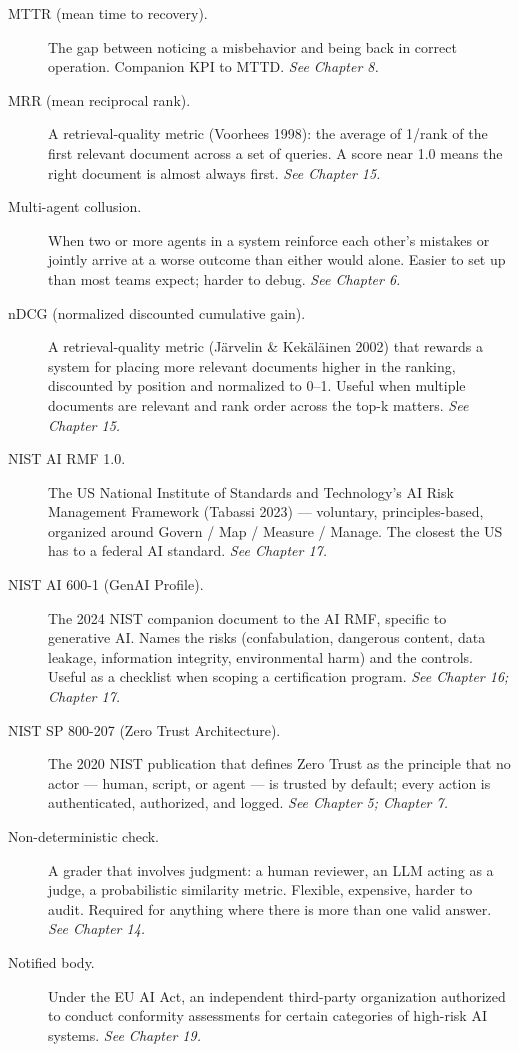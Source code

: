 \begin{description}
  \item[MTTR (mean time to recovery).] The gap between noticing a misbehavior and being back in correct operation. Companion KPI to MTTD. \textit{See Chapter 8.}
  \item[MRR (mean reciprocal rank).] A retrieval-quality metric (Voorhees 1998): the average of 1/rank of the first relevant document across a set of queries. A score near 1.0 means the right document is almost always first. \textit{See Chapter 15.}
  \item[Multi-agent collusion.] When two or more agents in a system reinforce each other's mistakes or jointly arrive at a worse outcome than either would alone. Easier to set up than most teams expect; harder to debug. \textit{See Chapter 6.}
  \item[nDCG (normalized discounted cumulative gain).] A retrieval-quality metric (Järvelin \& Kekäläinen 2002) that rewards a system for placing more relevant documents higher in the ranking, discounted by position and normalized to 0–1. Useful when multiple documents are relevant and rank order across the top-k matters. \textit{See Chapter 15.}
  \item[NIST AI RMF 1.0.] The US National Institute of Standards and Technology's AI Risk Management Framework (Tabassi 2023) — voluntary, principles-based, organized around Govern / Map / Measure / Manage. The closest the US has to a federal AI standard. \textit{See Chapter 17.}
  \item[NIST AI 600-1 (GenAI Profile).] The 2024 NIST companion document to the AI RMF, specific to generative AI. Names the risks (confabulation, dangerous content, data leakage, information integrity, environmental harm) and the controls. Useful as a checklist when scoping a certification program. \textit{See Chapter 16; Chapter 17.}
  \item[NIST SP 800-207 (Zero Trust Architecture).] The 2020 NIST publication that defines Zero Trust as the principle that no actor — human, script, or agent — is trusted by default; every action is authenticated, authorized, and logged. \textit{See Chapter 5; Chapter 7.}
  \item[Non-deterministic check.] A grader that involves judgment: a human reviewer, an LLM acting as a judge, a probabilistic similarity metric. Flexible, expensive, harder to audit. Required for anything where there is more than one valid answer. \textit{See Chapter 14.}
  \item[Notified body.] Under the EU AI Act, an independent third-party organization authorized to conduct conformity assessments for certain categories of high-risk AI systems. \textit{See Chapter 19.}

\end{description}
